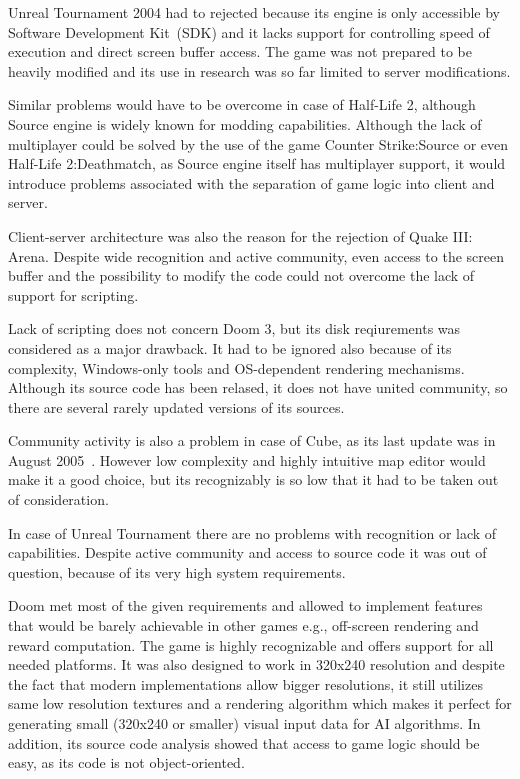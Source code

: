 Unreal Tournament 2004 had to rejected because its engine is only accessible by Software Development Kit~(SDK) and it lacks support for controlling speed of execution and direct screen buffer access.
The game was not prepared to be heavily modified and its use in research was so far limited to server modifications.

Similar problems would have to be overcome in case of Half-Life 2, although Source engine is widely known for modding capabilities.
Although the lack of multiplayer could be solved by the use of the game Counter Strike:Source or even Half-Life 2:Deathmatch, as Source engine itself has multiplayer support, it would introduce problems associated with the separation of game logic into client and server.

Client-server architecture was also the reason for the rejection of Quake III: Arena.
Despite wide recognition and active community, even access to the screen buffer and the possibility to modify the code could not overcome the lack of support for scripting.

Lack of scripting does not concern Doom 3, but its disk reqiurements was considered as a major drawback.
It had to be ignored also because of its complexity, Windows-only tools and OS-dependent rendering mechanisms.
Although its source code has been relased, it does not have united community, so there are several rarely updated versions of its sources.

Community activity is also a problem in case of Cube, as its last update was in August 2005~\cite{cube}.
However low complexity and highly intuitive map editor would make it a good choice, but its recognizably is so low that it had to be taken out of consideration. 

In case of Unreal Tournament there are no problems with recognition or lack of capabilities.
Despite active community and access to source code it was out of question, because of its very high system requirements.




Doom met most of the given requirements and allowed to implement features that would be barely achievable in other games e.g., off-screen rendering and reward computation.
The game is highly recognizable and offers support for all needed platforms.
It was also designed to work in 320x240 resolution and despite the fact that modern implementations allow bigger resolutions, it still utilizes same low resolution textures and a rendering algorithm which makes it perfect for generating small (320x240 or smaller) visual input data for AI algorithms.
In addition, its source code analysis showed that access to game logic should be easy, as its code is not object-oriented.

